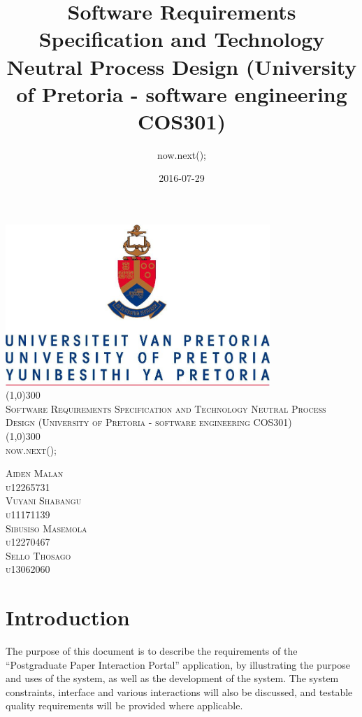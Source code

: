 \documentclass{article}
\title{
Software Requirements Specification and 
Technology Neutral Process Design
(University of Pretoria - software engineering COS301)
}
\date{2016-07-29}
\author{now.next();}
\begin{document}
\begin{titlepage}
	\begin{center}
		\includegraphics[width=10cm]{UP.jpg}  \\
		[1cm]
		\line(1,0){300} \\
		[0.4cm]
		\textsc{\huge
			Software Requirements Specification and 
			Technology Neutral Process Design
			(University of Pretoria - software engineering COS301)
		} \\
		[0.1cm]
		\line(1,0){300} \\
		[0.4cm]
		\textsc{\Large
			now.next();		} \\

	\end{center}
	\begin{flushright}
	\textsc{\Large
	Aiden Malan\\ 
	u12265731\\
	Vuyani Shabangu\\
	u11171139\\
	Sibusiso Masemola\\ 
	u12270467\\
	Sello Thosago\\
	u13062060\
	}
	\end{flushright}
\end{titlepage}

\tableofcontents
\thispagestyle{empty}
\cleardoublepage

\setcounter{page}{1}
\section{Introduction}
The purpose of this document is to describe the requirements of the “Postgraduate Paper Interaction Portal” application, by illustrating the purpose and uses of the system, as well as the development of the system. The system constraints, interface and various interactions will also be discussed, and testable quality requirements will be provided where applicable.
\end{document}
